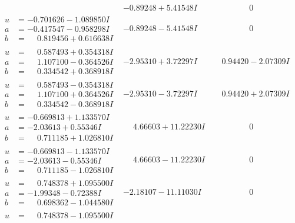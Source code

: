 \documentclass[1p]{elsarticle_modified}
\theoremstyle{definition}
\begin{document}
$$\begin{array}{c|c|c}
 & -0.89248 + 5.41548 I & \phantom{-0.000000 } 0 \\ \hline\begin{aligned}
u &= -0.701626 - 1.089850 I \\
a &= -0.417547 - 0.958298 I \\
b &= \phantom{-}0.819456 + 0.616638 I\end{aligned}
 & -0.89248 - 5.41548 I & \phantom{-0.000000 } 0 \\ \hline\begin{aligned}
u &= \phantom{-}0.587493 + 0.354318 I \\
a &= \phantom{-}1.107100 - 0.364526 I \\
b &= \phantom{-}0.334542 + 0.368918 I\end{aligned}
 & -2.95310 + 3.72297 I & \phantom{-}0.94420 - 2.07309 I \\ \hline\begin{aligned}
u &= \phantom{-}0.587493 - 0.354318 I \\
a &= \phantom{-}1.107100 + 0.364526 I \\
b &= \phantom{-}0.334542 - 0.368918 I\end{aligned}
 & -2.95310 - 3.72297 I & \phantom{-}0.94420 + 2.07309 I \\ \hline\begin{aligned}
u &= -0.669813 + 1.133570 I \\
a &= -2.03613 + 0.55346 I \\
b &= \phantom{-}0.711185 + 1.026810 I\end{aligned}
 & \phantom{-}4.66603 + 11.22230 I & \phantom{-0.000000 } 0 \\ \hline\begin{aligned}
u &= -0.669813 - 1.133570 I \\
a &= -2.03613 - 0.55346 I \\
b &= \phantom{-}0.711185 - 1.026810 I\end{aligned}
 & \phantom{-}4.66603 - 11.22230 I & \phantom{-0.000000 } 0 \\ \hline\begin{aligned}
u &= \phantom{-}0.748378 + 1.095500 I \\
a &= -1.99348 - 0.72388 I \\
b &= \phantom{-}0.698362 - 1.044580 I\end{aligned}
 & -2.18107 - 11.11030 I & \phantom{-0.000000 } 0 \\ \hline\begin{aligned}
u &= \phantom{-}0.748378 - 1.095500 I \\

\end{aligned}
\end{array}$$
\end{document}
